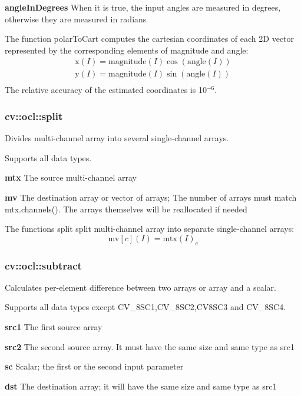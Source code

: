 \documentclass{article}
\begin{document}
\textbf{angleInDegrees }When it is true, the input angles are measured in
degrees, otherwise they are measured in radians

The function polarToCart computes the cartesian coordinates of each 2D
vector represented by the corresponding elements of magnitude and angle:
\[
\begin{array}{l}
 \mbox{x}\left( I \right)=\mbox{magnitude}\left( I \right)\cos \left(
{\mbox{angle}\left( I \right)} \right) \\
 \mbox{y}\left( I \right)=\mbox{magnitude}\left( I \right)\sin \left(
{\mbox{angle}\left( I \right)} \right) \\
 \end{array}
\]
The relative accuracy of the estimated coordinates is 10$^{-6}$.

\newpage

\subsubsection{cv::ocl::split }
\label{subsubsec:mylabel27}
Divides multi-channel array into several single-channel arrays.

Supports all data types.

\textbf{mtx }The source multi-channel array

\textbf{mv }The destination array or vector of arrays; The number of arrays
must match mtx.channels(). The arrays themselves will be reallocated if
needed

The functions split split multi-channel array into separate single-channel
arrays:
\[
\mbox{mv}\left[ c \right](I)=\mbox{mtx}(I)_c
\]
\newpage

\subsubsection{cv::ocl::subtract}
\label{subsubsec:mylabel28}
Calculates per-element difference between two arrays or array and a scalar.

Supports all data types except CV{\_}8SC1,CV{\_}8SC2,CV8SC3 and CV{\_}8SC4.

\textbf{src1 }The first source array

\textbf{src2 }The second source array. It must have the same size and same
type as src1

\textbf{sc }Scalar; the first or the second input parameter

\textbf{dst }The destination array; it will have the same size and same type
as src1
\end{document}
